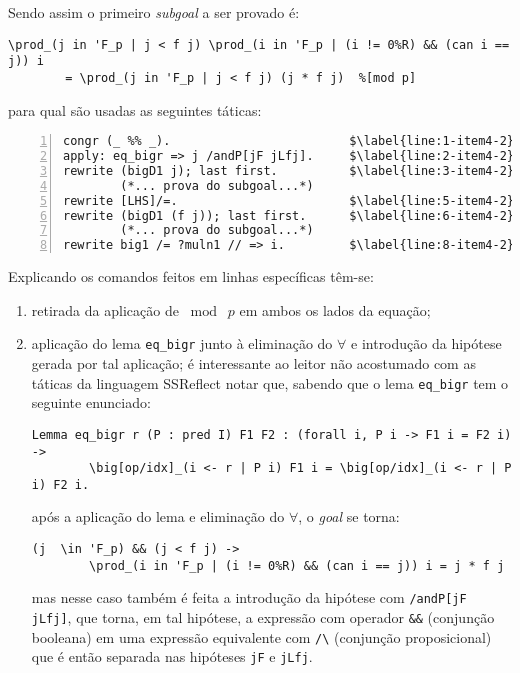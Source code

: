 \begin{enumerate}[label=\textbf{\roman*.}]
        Sendo assim o primeiro \textit{subgoal} a ser provado é:
                \begin{lstlisting}[language=coq,frame=single,tabsize=1]
\prod_(j in 'F_p | j < f j) \prod_(i in 'F_p | (i != 0%R) && (can i == j)) i
        = \prod_(j in 'F_p | j < f j) (j * f j)  %[mod p]
                \end{lstlisting}
        para qual são usadas as seguintes táticas:
                \begin{lstlisting}[language=coq,frame=single, numbers=left,stepnumber=1,tabsize=1, escapechar=\$]
congr (_ %% _).                         $\label{line:1-item4-2}$
apply: eq_bigr => j /andP[jF jLfj].     $\label{line:2-item4-2}$
rewrite (bigD1 j); last first.          $\label{line:3-item4-2}$
        (*... prova do subgoal...*)
rewrite [LHS]/=.                        $\label{line:5-item4-2}$
rewrite (bigD1 (f j)); last first.      $\label{line:6-item4-2}$
        (*... prova do subgoal...*)
rewrite big1 /= ?muln1 // => i.         $\label{line:8-item4-2}$
                \end{lstlisting}
        Explicando os comandos feitos em linhas específicas têm-se:
        \begin{enumerate}
                
                \item[\textbf{(\ref{line:1-item4-2})}] retirada da aplicação de $\bmod \; p$ em ambos os lados da equação;
                
                \item[\textbf{(\ref{line:2-item4-2})}]aplicação do lema \lstinline[language=coq]|eq_bigr| junto à eliminação do $\forall$ e introdução da hipótese gerada por tal aplicação; é interessante ao leitor não acostumado com as táticas da linguagem SSReflect notar que, sabendo que o lema \lstinline[language=coq]|eq_bigr| tem o seguinte enunciado:
                        \begin{lstlisting}[language=coq,frame=single,tabsize=1]
Lemma eq_bigr r (P : pred I) F1 F2 : (forall i, P i -> F1 i = F2 i) ->
        \big[op/idx]_(i <- r | P i) F1 i = \big[op/idx]_(i <- r | P i) F2 i.
                        \end{lstlisting}
                após a aplicação do lema e eliminação do $\forall$, o \textit{goal} se torna:
                        \begin{lstlisting}[language=coq,frame=single,tabsize=1]
(j  \in 'F_p) && (j < f j) -> 
        \prod_(i in 'F_p | (i != 0%R) && (can i == j)) i = j * f j
                        \end{lstlisting}
                mas nesse caso também é feita a introdução da hipótese com \lstinline[language=coq]|/andP[jF jLfj]|, que torna, em tal hipótese, a expressão com operador \lstinline[language=coq]|&&| (conjunção booleana) em uma expressão equivalente com \lstinline[language=coq]|/\| (conjunção proposicional) que é então separada nas hipóteses \lstinline[language=coq]|jF| e \lstinline[language=coq]|jLfj|.


\end{enumerate}
\end{enumerate}
